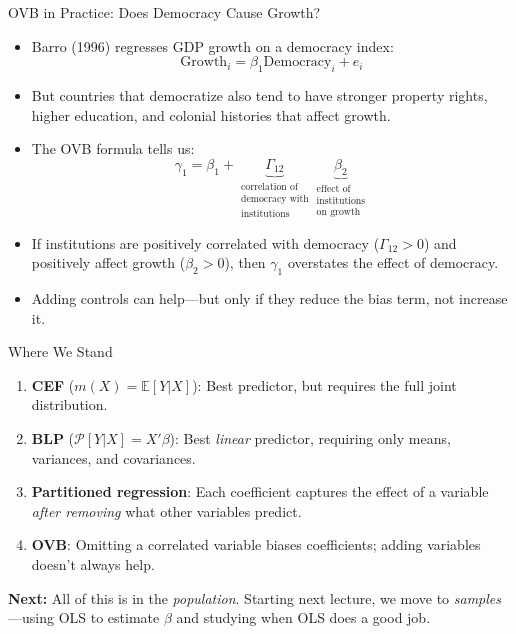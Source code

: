\documentclass[aspectratio=169]{beamer}
\numberwithin{equation}{section}
\begin{document}
\begin{frame}{OVB in Practice: Does Democracy Cause Growth?}
\begin{itemize}
\item Barro (1996) regresses GDP growth on a democracy index:
$$\text{Growth}_i = \beta_1 \text{Democracy}_i + e_i$$
\item But countries that democratize also tend to have stronger property rights, higher education, and colonial histories that affect growth.\pause
\item The OVB formula tells us:
$$\gamma_1 = \beta_1 + \underbrace{\Gamma_{12}}_{\substack{\text{correlation of}\\\text{democracy with}\\\text{institutions}}}\underbrace{\beta_2}_{\substack{\text{effect of}\\\text{institutions}\\\text{on growth}}}$$\pause
\item If institutions are positively correlated with democracy ($\Gamma_{12}>0$) and positively affect growth ($\beta_2>0$), then $\gamma_1$ \alert{overstates} the effect of democracy.
\item Adding controls can help---but only if they reduce the bias term, not increase it.
\end{itemize}
\end{frame}


\begin{frame}{Where We Stand}
\small
\begin{tcolorbox}[colback=blue!5, colframe=blue!50, title=Recap: From Population to Practice]
\begin{enumerate}
\item \textbf{CEF} ($m(X)=\mathbb{E}[Y|X]$): Best predictor, but requires the full joint distribution.
\item \textbf{BLP} ($\mathcal{P}[Y|X]=X'\beta$): Best \emph{linear} predictor, requiring only means, variances, and covariances.
\item \textbf{Partitioned regression}: Each coefficient captures the effect of a variable \emph{after removing} what other variables predict.
\item \textbf{OVB}: Omitting a correlated variable biases coefficients; adding variables doesn't always help.
\end{enumerate}
\end{tcolorbox}
\medskip
\textbf{Next:} All of this is in the \emph{population}. Starting next lecture, we move to \emph{samples}---using OLS to estimate $\beta$ and studying when OLS does a good job.
\end{frame}
\end{document}
